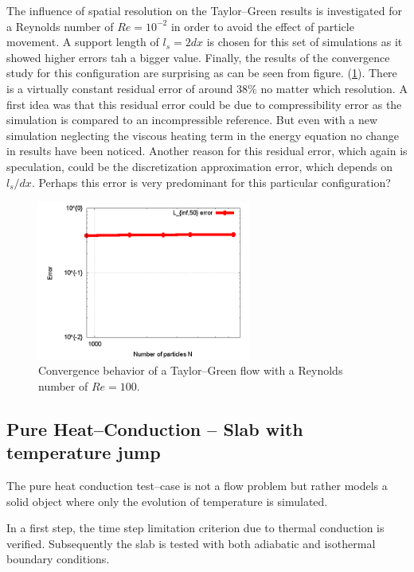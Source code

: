 \documentclass[11pt,a4paper,twoside]{report}
\begin{document}
The influence of spatial resolution on the Taylor--Green results is investigated for a Reynolds number of $Re=10^{-2}$ in order to avoid the effect of particle movement. A support length of $l_s=2dx$ is chosen for this set of simulations as it showed higher errors tah a bigger value. Finally, the results of the convergence study for this configuration are surprising as can be seen from figure. (\ref{fig:Results_TG_Resolution}). There is a virtually constant residual error of around $38\%$ no matter which resolution. A first idea was that this residual error could be due to compressibility error as the simulation is compared to an incompressible reference. But even with a new simulation neglecting the viscous heating term in the energy equation no change in results have been noticed. Another reason for this residual error, which again is speculation, could be the discretization approximation error, which depends on $l_s/dx$. Perhaps this error is very predominant for this particular configuration? 


\begin{figure}[h]
 \label{fig:Results_TG_Resolution}
\centering
\includegraphics[width=7cm]{Graphics/results/TaylorGreen/Eta_100_suplen2dx_ResStudy/ErrorResolution}
\caption[Convergence Taylor--Green]{Convergence behavior of a Taylor--Green flow with a Reynolds number of $Re=100$.}
\end{figure}


\subsection{Pure Heat--Conduction  -- Slab with temperature jump}

The pure heat conduction test--case is not a flow problem but rather models a solid object where only the evolution of temperature is simulated. 

In a first step, the time step limitation criterion due to thermal conduction is verified. Subsequently the slab is tested with both adiabatic and isothermal boundary conditions. 
\end{document}
